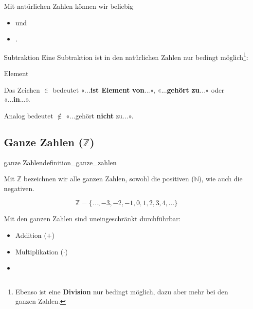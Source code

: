 

Mit natürlichen Zahlen können wir beliebig
\begin{itemize}
\item {}  und
\item {}.
\end{itemize}

\begin{bemerkung}{Subtraktion}{}
  Eine Subtraktion ist in den natürlichen Zahlen nur bedingt
  möglich\footnote{Ebenso ist eine \textbf{Division} nur bedingt
    möglich, dazu aber mehr bei den ganzen Zahlen.}:
\end{bemerkung}

\begin{definition}{Element}{}
  
  Das Zeichen $\in$ bedeutet «...\textbf{ist Element von}...»,
  «...\textbf{gehört zu}...» oder «...\textbf{in}...».

  \vspace{5mm}
  
  Analog bedeutet $\not\in$ «...gehört \textbf{nicht} zu...».
\end{definition}

\newpage


\subsection{Ganze Zahlen ($\mathbb{Z}$)}
\begin{definition}{ganze Zahlen}{definition_ganze_zahlen}

  Mit $\mathbb{Z}$ bezeichnen wir alle ganzen Zahlen, sowohl die
  positiven ($\mathbb{N}$), wie auch die negativen.
  \end{definition}

$$\mathbb{Z} = \{..., -3, -2, -1, 0, 1, 2, 3,  4, ... \}$$

Mit den ganzen Zahlen sind uneingeschränkt durchführbar:
\begin{itemize}
\item Addition ($+$)
  \item Multiplikation ($\cdot$)
\item {}
  \end{itemize}


